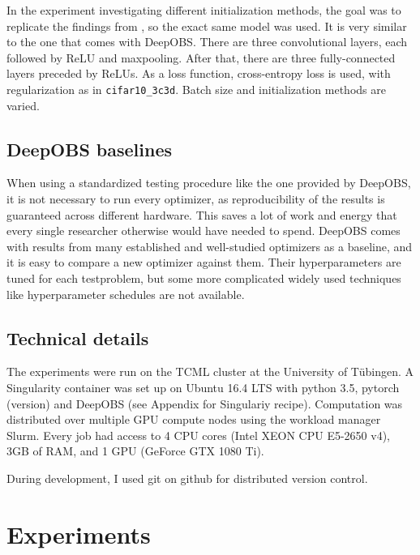 \documentclass[twoside,12pt,a4paper]{report}
\begin{document}
In the experiment investigating different initialization methods, the goal was to replicate the findings from \cite{roos2019active}, so the exact same model was used. It is very similar to the one that comes with DeepOBS. There are three convolutional layers, each followed by ReLU and maxpooling. After that, there are three fully-connected layers preceded by ReLUs. As a loss function, cross-entropy loss is used, with regularization as in \verb|cifar10_3c3d|.
Batch size and initialization methods are varied.


\section{DeepOBS baselines}
When using a standardized testing procedure like the one provided by DeepOBS, it is not necessary to run every optimizer, as reproducibility of the results is guaranteed across different hardware. This saves a lot of work and energy that every single researcher otherwise would have needed to spend.
DeepOBS comes with results from many established and well-studied optimizers as a baseline, and it is easy to compare a new optimizer against them. Their hyperparameters are tuned for each testproblem, but some more complicated widely used techniques like hyperparameter schedules are not available.

\section{Technical details}
The experiments were run on the TCML cluster at the University of Tübingen.
A Singularity container was set up on Ubuntu 16.4 LTS with python 3.5, pytorch (version) and DeepOBS (see Appendix for Singulariy recipe).
Computation was distributed over multiple GPU compute nodes using the workload manager Slurm. Every job had access to 4 CPU cores (Intel XEON CPU E5-2650 v4), 3GB of RAM, and 1 GPU (GeForce GTX 1080 Ti).

During development, I used git on github for distributed version control.


\chapter{Experiments}
\end{document}
